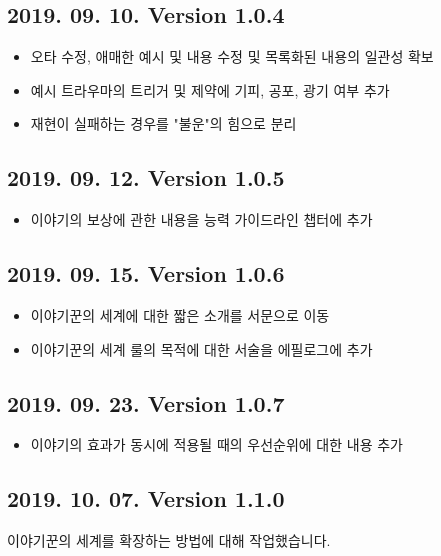 \documentclass{report}
\begin{document}
	\subsection*{2019. 09. 10. Version 1.0.4}
	\begin{itemize}
		\item 오타 수정, 애매한 예시 및 내용 수정 및 목록화된 내용의 일관성 확보
		\item 예시 트라우마의 트리거 및 제약에 기피, 공포, 광기 여부 추가
		\item 재현이 실패하는 경우를 "불운"의 힘으로 분리
	\end{itemize}
	
	\subsection*{2019. 09. 12. Version 1.0.5}
	\begin{itemize}
		\item 이야기의 보상에 관한 내용을 능력 가이드라인 챕터에 추가
	\end{itemize}
	
	\subsection*{2019. 09. 15. Version 1.0.6}
	\begin{itemize}
		\item 이야기꾼의 세계에 대한 짧은 소개를 서문으로 이동
		\item 이야기꾼의 세계 룰의 목적에 대한 서술을 에필로그에 추가
	\end{itemize}
	
	\subsection*{2019. 09. 23. Version 1.0.7}
	\begin{itemize}
		\item 이야기의 효과가 동시에 적용될 때의 우선순위에 대한 내용 추가
	\end{itemize}
\fi

	\subsection*{2019. 10. 07. Version 1.1.0}
	이야기꾼의 세계를 확장하는 방법에 대해 작업했습니다.
\iffalse
	\begin{itemize}
		\item 시스템의 권능과 이야기꾼의 권능과 제약에 대한 자세한 설명을 추가했습니다.
		\item 이야기꾼의 세계를 확장시키는 방법과 이야기꾼의 세계를 확장 룰로 사용하는 방법을 추가했습니다.
		\item 이야기를 만들며 알아두어야 할 점에 대해 추가했습니다.
		\item 스탯에 대한 설명을 추가했습니다.
	\end{itemize}
\fi
\end{document}

